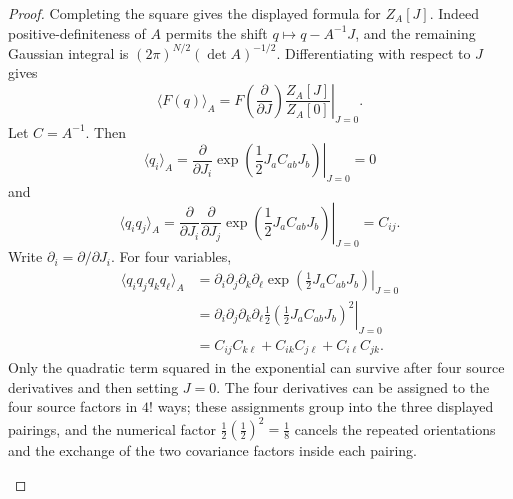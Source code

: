 \begin{proof}
Completing the square gives the displayed formula for \(Z_A[J]\).  Indeed
positive-definiteness of \(A\) permits the shift
\(q\mapsto q-A^{-1}J\), and the remaining Gaussian integral is
\((2\pi)^{N/2}(\det A)^{-1/2}\).  Differentiating with respect to \(J\)
gives
\[
  \langle F(q)\rangle_A
  =
  \left.
  F\left(\frac{\partial}{\partial J}\right)
  \frac{Z_A[J]}{Z_A[0]}
  \right|_{J=0}.
\]
Let \(C=A^{-1}\).  Then
\[
  \langle q_i\rangle_A
  =
  \left.
  \frac{\partial}{\partial J_i}
  \exp\left(\frac12J_aC_{ab}J_b\right)
  \right|_{J=0}
  =
  0
\]
and
\[
  \langle q_iq_j\rangle_A
  =
  \left.
  \frac{\partial}{\partial J_i}
  \frac{\partial}{\partial J_j}
  \exp\left(\frac12J_aC_{ab}J_b\right)
  \right|_{J=0}
  =
  C_{ij}.
\]
Write \(\partial_i=\partial/\partial J_i\).  For four variables,
\[
\begin{aligned}
  \langle q_iq_jq_kq_\ell\rangle_A
  &=
  \left.
  \partial_i\partial_j\partial_k\partial_\ell
  \exp\left(\frac12J_aC_{ab}J_b\right)
  \right|_{J=0}  \\
  &=
  \left.
  \partial_i\partial_j\partial_k\partial_\ell
  \frac12\left(\frac12J_aC_{ab}J_b\right)^2
  \right|_{J=0}  \\
  &=
  C_{ij}C_{k\ell}+C_{ik}C_{j\ell}+C_{i\ell}C_{jk}.
\end{aligned}
\]
Only the quadratic term squared in the exponential can survive after four
source derivatives and then setting \(J=0\).  The four derivatives can be
assigned to the four source factors in \(4!\) ways; these assignments group
into the three displayed pairings, and the numerical factor
\(\frac12(\frac12)^2=\frac18\) cancels the repeated orientations and the
exchange of the two covariance factors inside each pairing.

\begin{center}
\end{center}


\end{proof}
